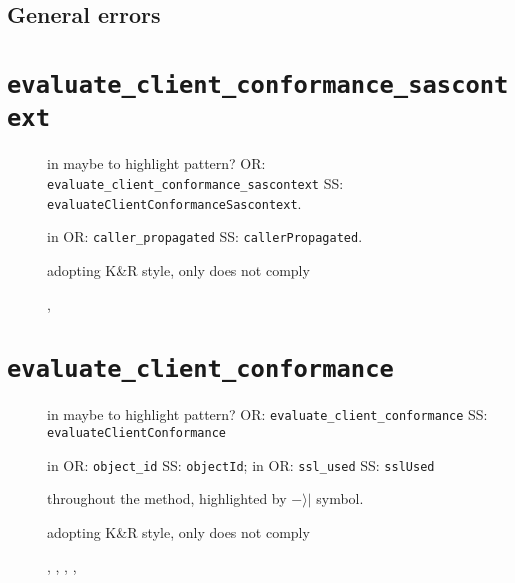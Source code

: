 \subsection{General errors}



\clearpage
\section{\normalfont\texttt{evaluate\_client\_conformance\_sascontext}}

\begin{description}
	\item [] 
		in  maybe to highlight pattern? 
			OR: \texttt{evaluate\_client\_conformance\_sascontext}
			SS: \texttt{evaluateClientConformanceSascontext}.
	\item [] 
		in  
			OR: \texttt{caller\_propagated}
			SS: \texttt{callerPropagated}.
	\item []
		adopting K\&R style, only  does not comply
	\item [] , 
\end{description}








\clearpage
\section{\normalfont\texttt{evaluate\_client\_conformance}}

\begin{description}
	\item [] 
		in  maybe to highlight pattern? 
			OR: \texttt{evaluate\_client\_conformance}
			SS: \texttt{evaluateClientConformance}
	\item [] 
		in  
			OR: \texttt{object\_id}
			SS: \texttt{objectId}; 
		in  
			OR: \texttt{ssl\_used}
			SS: \texttt{sslUsed}
	\item []
		throughout the method, highlighted by $-\rangle|$ symbol. %
	\item []
		adopting K\&R style, only  does not comply
	\item [] , , , , 

\end{description}















